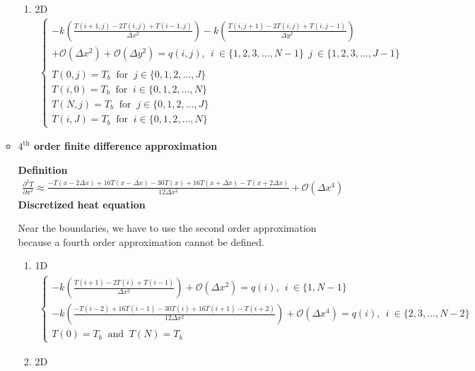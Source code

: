 \documentclass[12 pt, final]{article}
\begin{document}
\begin{itemize}
\begin{itemize}
\begin{enumerate}
                \item 2D
                \begin{align}
                \begin{cases}    -k\left(\frac{T(i+1,j)-2T(i,j)+T(i-1,j)}{\Delta x^2}\right) -k\left(\frac{T(i,j+1)-2T(i,j)+T(i,j-1)}{\Delta y^2}\right) \\
                +\mathcal{O}(\Delta x^2) + \mathcal{O}(\Delta y^2)= q(i,j),\:\: i \:\in \{1,2,3,\hdots, N-1\}\:\:j \:\in \{1,2,3,\hdots, J-1\}\\\\
                T(0,j) = T_b \:\text{ for }\: j\in\{0, 1, 2, \hdots , J\}\\
                T(i,0) = T_b \:\text{ for }\: i\in\{0, 1, 2, \hdots , N\}\\
                T(N,j) = T_b \:\text{ for }\: j\in\{0, 1, 2, \hdots , J\}\\
                T(i,J) = T_b \:\text{ for }\: i\in\{0, 1, 2, \hdots , N\} \label{eq3}
                \end{cases}
                \end{align}
                
            \end{enumerate}
            \item \textbf{$4^{\text{th}}$ order finite difference approximation}
            
            \textbf{Definition}
            \begin{align*}
                \frac{\partial^2 T}{\partial x^2} \approx \frac{-T(x-2\Delta x) + 16 T(x-\Delta x) - 30 T(x) + 16 T(x+\Delta x) - T(x+2\Delta x)}{12 \Delta x^2}+ \mathcal{O}(\Delta x^4)
            \end{align*}            
            \textbf{Discretized heat equation}
            
            Near the boundaries, we have to use the second order approximation because a fourth order approximation cannot be defined.
            \begin{enumerate}
                \item 1D
                \begin{align}
                \begin{cases}
                    -k\left(\frac{T(i+1)-2T(i)+T(i-1)}{\Delta x^2}\right) + \mathcal{O}(\Delta x^2) = q(i), \:\: i \:\in \{1,N-1\}\\
                    -k\left(\frac{-T(i-2) + 16 T(i-1) - 30 T(i) + 16 T(i+1) - T(i+2)}{12 \Delta x^2}\right)+ \mathcal{O}(\Delta x^4) = q(i), \:\: i \:\in \{2,3,\hdots, N-2\}\\
                    T(0) = T_b \:\text{ and }\: T(N) = T_b \label{eq4}
                \end{cases}
                \end{align}
                \item 2D
                

\end{enumerate}
\end{itemize}
\end{itemize}
\end{document}
